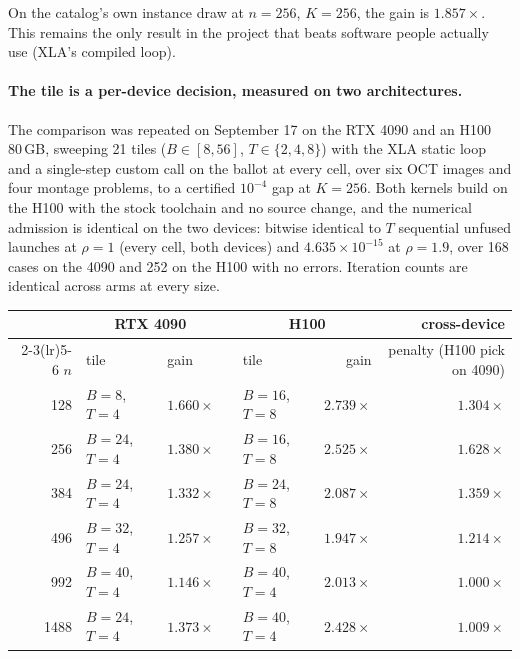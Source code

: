 \documentclass[11pt]{article}
\begin{document}
On the catalog's own instance draw at $n=256$, $K=256$, the gain is
$1.857\times$. This remains the only result in the project that beats software
people actually use (XLA's compiled loop).

\paragraph{The tile is a per-device decision, measured on two architectures.}
The comparison was repeated on September 17 on the RTX 4090 and an H100 80\,GB,
sweeping 21 tiles ($B \in [8, 56]$, $T \in \{2, 4, 8\}$) with the XLA static
loop and a single-step custom call on the ballot at every cell, over six OCT
images and four montage problems, to a certified $10^{-4}$ gap at $K=256$.
Both kernels build on the H100 with the stock toolchain and no source change,
and the numerical admission is identical on the two devices: bitwise identical
to $T$ sequential unfused launches at $\rho = 1$ (every cell, both devices) and
$4.635\times10^{-15}$ at $\rho = 1.9$, over 168 cases on the 4090 and 252 on
the H100 with no errors. Iteration counts are identical across arms at every
size.

\begin{center}
\small
\begin{tabular}{rllrlrr}
\toprule
 & \multicolumn{2}{c}{RTX 4090} & & \multicolumn{2}{c}{H100} & cross-device \\
\cmidrule(lr){2-3}\cmidrule(lr){5-6}
$n$ & tile & gain & & tile & gain & penalty (H100 pick on 4090) \\
\midrule
128  & $B{=}8$, $T{=}4$  & $1.660\times$ & & $B{=}16$, $T{=}8$ & $2.739\times$ & $1.304\times$ \\
256  & $B{=}24$, $T{=}4$ & $1.380\times$ & & $B{=}16$, $T{=}8$ & $2.525\times$ & $1.628\times$ \\
384  & $B{=}24$, $T{=}4$ & $1.332\times$ & & $B{=}24$, $T{=}8$ & $2.087\times$ & $1.359\times$ \\
496  & $B{=}32$, $T{=}4$ & $1.257\times$ & & $B{=}32$, $T{=}8$ & $1.947\times$ & $1.214\times$ \\
992  & $B{=}40$, $T{=}4$ & $1.146\times$ & & $B{=}40$, $T{=}4$ & $2.013\times$ & $1.000\times$ \\
1488 & $B{=}24$, $T{=}4$ & $1.373\times$ & & $B{=}40$, $T{=}4$ & $2.428\times$ & $1.009\times$ \\
\bottomrule
\end{tabular}
\end{center}
\end{document}
